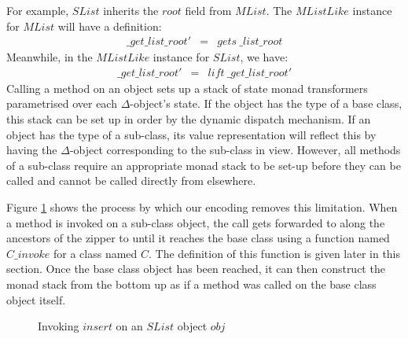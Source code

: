 For example, $\mathit{SList}$ inherits the $\mathit{root}$ field from $\mathit{MList}$. The $\mathit{MListLike}$ instance for $\mathit{MList}$ will have a definition:
\begin{displaymath}
\begin{array}{lcl}
\mathit{\_get\_list\_root'} & = & \mathit{gets}~\mathit{\_list\_root}
\end{array}
\end{displaymath}
Meanwhile, in the $\mathit{MListLike}$ instance for $\mathit{SList}$, we have:
\begin{displaymath}
\begin{array}{lcl}
\mathit{\_get\_list\_root'} & = & \mathit{lift}~\mathit{\_get\_list\_root'}
\end{array}
\end{displaymath}
Calling a method on an object sets up a stack of state monad transformers parametrised over each $\Delta$-object's state. If the object has the type of a base class, this stack can be set up in order by the dynamic dispatch mechanism. If an object has the type of a sub-class, its value representation will reflect this by having the $\Delta$-object corresponding to the sub-class in view. However, all methods of a sub-class require an appropriate monad stack to be set-up before they can be called and cannot be called directly from elsewhere.

Figure \ref{fig:subinvoke} shows the process by which our encoding removes this limitation. When a method is invoked on a sub-class object, the call gets forwarded to along the ancestors of the zipper to until it reaches the base class using a function named $C\_\mathit{invoke}$ for a class named $C$. The definition of this function is given later in this section. Once the base class object has been reached, it can then construct the monad stack from the bottom up as if a method was called on the base class object itself.

\begin{figure}
    \begin{center}
    \end{center}
    \caption{Invoking $\mathit{insert}$ on an $\mathit{SList}$ object $\mathit{obj}$} \label{fig:subinvoke}
\end{figure}


